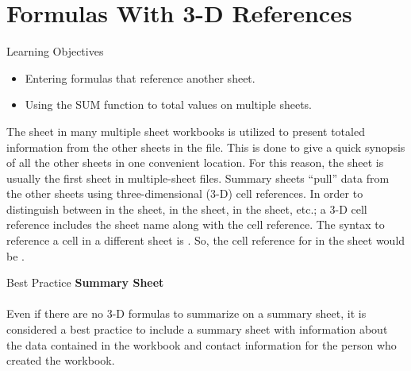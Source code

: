 \section{Formulas With 3-D References}

\begin{center}
	\begin{objbox}{Learning Objectives}
		\begin{itemize}
			\setlength{\itemsep}{0pt}
			\setlength{\parskip}{0pt}
			\setlength{\parsep}{0pt}

			\item Entering formulas that reference another sheet.
			\item Using the SUM function to total values on multiple sheets.
			
		\end{itemize}
	\end{objbox}
\end{center}

The  sheet in many multiple sheet workbooks is utilized to present totaled information from the other sheets in the file. This is done to give a quick synopsis of all the other sheets in one convenient location. For this reason, the  sheet is usually the first sheet in multiple-sheet files. Summary sheets ``pull'' data from the other sheets using three-dimensional (3-D) cell references. In order to distinguish between  in the  sheet,  in the  sheet,  in the  sheet, etc.; a 3-D cell reference includes the sheet name along with the cell reference. The syntax to reference a cell in a different sheet is . So, the cell reference for  in the  sheet would be .

\begin{center}
	\begin{infobox}{Best Practice}
		\textbf{Summary Sheet}
		\\
		\\
		Even if there are no 3-D formulas to summarize on a summary sheet, it is considered a best practice to include a summary sheet with information about the data contained in the workbook and contact information for the person who created the workbook.  
	\end{infobox}
\end{center}

